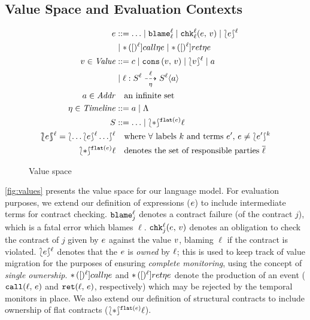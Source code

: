 \subsection{Value Space and Evaluation Contexts}

\begin{figure}
\begin{align*}
\mexp &::= \ldots
 \alt \sblame{\mmlab}{\mmlab}
 \alt \schk{\mmlab}{\mmlab}{\mexp}{\mval}
 \alt \sown{\mexp}{\mmlab} \\
&\alt \scall{\mmlab}{\mtimeline}{\mexp}
 \alt \sret{\mmlab}{\mtimeline}{\mexp}
\\
\mval \in \Value &::=
      \mconstant
 \alt \vcons{\mval}{\mval}
 \alt \sown{\mval}{\mmlab}
 \alt \maddr \\
&\alt \bclos{\mmlab}{\mscon}{\mmlab}{\mmlab}{\mtimeline}{\mscon}{\mmlab}{\maddr}
\\
\maddr \in \Addr &\quad\text{an infinite set} \\
\mstimeline \in \Timeline &::= \maddr \alt \toplevel
\\
\mscon &::= \ldots
\alt \sown*{\sflat{\mexp}}{\mmlab}
\\
\sOwn{\mexp}{\mmlab} = \sown{ \ldots \sown{\mexp}{\mmlab} \ldots }{\mmlab}
&\quad\text{where $\forall$ labels $k$ and terms $\mexp^\prime$, $\mexp \neq \sown{\mexp^\prime}{k}$}
\\
\sown*{\sflat{\mexp}}{\mmlab} &\quad\text{denotes the set of responsible parties $\overline{\mmlab}$}
\end{align*}
\caption{Value space}
\label{fig:values}
\end{figure}

%
\autoref{fig:values} presents the value space for our language model.
%
For evaluation purposes, we extend our definition of expressions ($e$) to include intermediate terms for contract checking.
%
${\tt blame}^{\ell}_{j}$ denotes a contract failure (of the contract $j$), which is a fatal error which blames $\ell$.
%
${\tt chk}{^{\ell}_{j}}({e,\, v})$ denotes an obligation to check the contract of $j$ given by $e$ against the value $v$, blaming $\ell$ if the contract is violated.
%
$\lbag e\rbag^{\ell}$ denotes that the $e$ is \emph{owned} \cite{ianjohnson:dthf:complete} by $\ell$; this is used to keep track of value migration for the purposes of ensuring \emph{complete monitoring}, using the concept of \emph{single ownership}.
%
${\tt *}{\,}({[})^{\ell}]{call}{\eta}{e}$ and ${\tt *}{\,}({[})^{\ell}]{ret}{\eta}{e}$ denote the production of an event (${\tt call}(\ell,\, e)$ and ${\tt ret}(\ell,\, e)$, respectively) which may be rejected by the temporal monitors in place.
%
We also extend our definition of structural contracts to include ownership of flat contracts ($\sown*{\sflat{\mexp}}{\mmlab}$).

